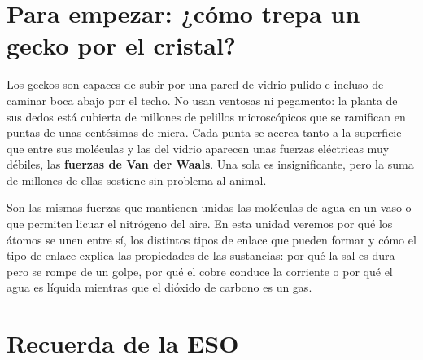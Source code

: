 

\section*{Para empezar: ¿cómo trepa un gecko por el cristal?}

Los geckos son capaces de subir por una pared de vidrio pulido e incluso de caminar boca abajo por el techo. No usan ventosas
ni pegamento: la planta de sus dedos está cubierta de millones de pelillos microscópicos que se ramifican en puntas de unas
centésimas de micra. Cada punta se acerca tanto a la superficie que entre sus moléculas y las del vidrio aparecen unas fuerzas
eléctricas muy débiles, las \textbf{fuerzas de Van der Waals}. Una sola es insignificante, pero la suma de millones de ellas
sostiene sin problema al animal.

Son las mismas fuerzas que mantienen unidas las moléculas de agua en un vaso o que permiten licuar el nitrógeno del aire. En esta
unidad veremos por qué los átomos se unen entre sí, los distintos tipos de enlace que pueden formar y cómo el tipo de enlace
explica las propiedades de las sustancias: por qué la sal es dura pero se rompe de un golpe, por qué el cobre conduce la
corriente o por qué el agua es líquida mientras que el dióxido de carbono es un gas.

\section{Recuerda de la ESO}\label{sec:ud4-eso}

